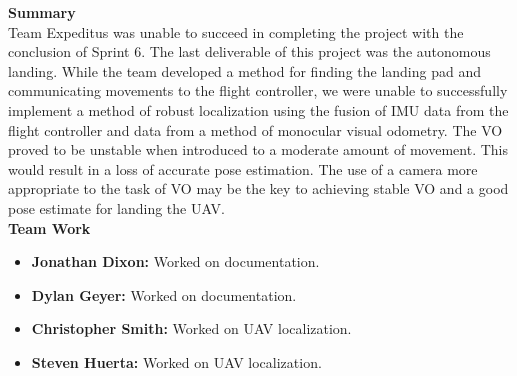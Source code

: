 \noindent \large{\textbf{Summary}}\\
\normalsize Team Expeditus was unable to succeed in completing the project with the conclusion of Sprint 6. The last deliverable of this project was the autonomous landing. While the team developed a method for finding the landing pad and communicating movements to the flight controller, we were unable to successfully implement a method of robust localization using the fusion of IMU data from the flight controller and data from a method of monocular visual odometry. The VO proved to be unstable when introduced to a moderate amount of movement. This would result in a loss of accurate pose estimation. The use of a camera more appropriate to the task of VO may be the key to achieving stable VO and a good pose estimate for landing the UAV. 
\vspace{5mm}
\\
\noindent \Large{\textbf{Team Work}}
\normalsize
\begin{itemize}
\item \textbf{Jonathan Dixon:} Worked on documentation.
\item \textbf{Dylan Geyer:} Worked on documentation.
\item \textbf{Christopher Smith:} Worked on UAV localization.
\item \textbf{Steven Huerta:} Worked on UAV localization. 
\end{itemize}

